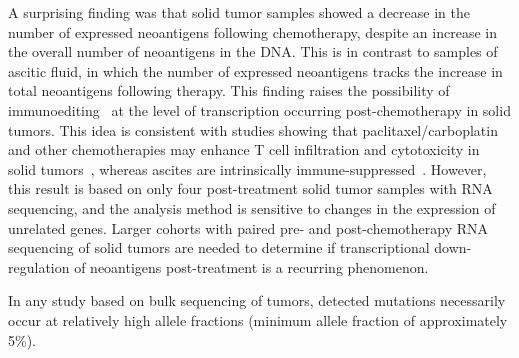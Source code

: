 
A surprising finding was that solid tumor samples showed a decrease in the number of expressed neoantigens following chemotherapy, despite an increase in the overall number of neoantigens in the DNA. This is in contrast to samples of ascitic fluid, in which the number of expressed neoantigens tracks the increase in total neoantigens following therapy. This finding raises the possibility of immunoediting~\cite{Dunn_2002} at the level of transcription occurring post-chemotherapy in solid tumors. This idea is consistent with studies showing that paclitaxel/carboplatin and other chemotherapies may enhance T cell infiltration and cytotoxicity in solid tumors~\cite{Demaria2001,Wu_2009,Pfannenstiel_2010,Hodge_2013}, whereas ascites are intrinsically immune-suppressed~\cite{Giuntoli2009,Simpson-Abelson2013,Singel2016}. However, this result is based on only four post-treatment solid tumor samples with RNA sequencing, and the analysis method is sensitive to changes in the expression of unrelated genes. Larger cohorts with paired pre- and post-chemotherapy RNA sequencing of solid tumors are needed to determine if transcriptional down-regulation of neoantigens post-treatment is a recurring phenomenon.

In any study based on bulk sequencing of tumors, detected mutations necessarily occur at relatively high allele fractions (minimum allele fraction of approximately 5\%).

